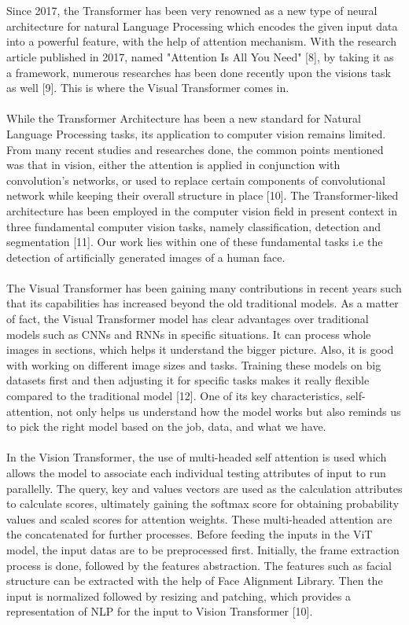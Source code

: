 \\\\
Since 2017, the Transformer has been very renowned as a new type of neural architecture for natural Language Processing which encodes the given input data into a powerful feature, with the help of attention mechanism.  With the research article published in 2017, named "Attention Is All You Need" [8], by taking it as a framework, numerous researches has been done recently upon the visions task as well [9]. This is where the Visual Transformer comes in. 
\\\\
While the Transformer Architecture has been a new standard for Natural Language Processing tasks, its application to computer vision remains limited. From many recent studies and researches done, the common points mentioned was that in vision, either the attention is applied in conjunction with convolution's networks, or used to replace certain components of convolutional network while keeping their overall structure in place [10].
The Transformer-liked architecture has been employed in the computer vision field in present context in three fundamental computer vision tasks, namely classification, detection and segmentation [11]. Our work lies within one of these fundamental tasks i.e the detection of artificially generated images of a human face.
\\\\
 The Visual Transformer has been gaining many contributions in recent years such that its capabilities has increased beyond the old traditional models. As a matter of fact, the Visual Transformer model has clear advantages over traditional models such as CNNs and RNNs in specific situations. It can process whole images in sections, which helps it understand the bigger picture. Also, it is good with working on different image sizes and tasks. 
 Training these models on big datasets first and then adjusting it for specific tasks makes it really flexible compared to the traditional model [12]. One of its key characteristics, self-attention, not only helps us understand how the model works but also reminds us to pick the right model based on the job, data, and what we have.
\\\\
In the Vision Transformer, the use of multi-headed self attention is used which allows the model to associate each individual testing attributes of input to run parallelly. The query, key and values vectors are used as the calculation attributes to calculate scores, ultimately gaining the softmax score for obtaining probability values and scaled scores for attention weights. These multi-headed attention are the concatenated for further processes. Before feeding the inputs in the ViT model, the input datas are to be preprocessed first. Initially, the frame extraction process is done, followed by the features abstraction. The features such as facial structure can be extracted with the help of Face Alignment Library. Then the input is normalized followed by resizing and patching, which provides a representation of NLP for the input to Vision Transformer [10].
